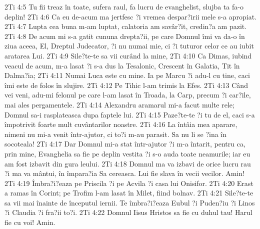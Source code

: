2Ti 4:5  Tu fii treaz în toate, sufera raul, fa lucru de evanghelist, slujba ta fa-o deplin!
2Ti 4:6  Ca eu de-acum ma jertfesc ?i vremea despar?irii mele s-a apropiat.
2Ti 4:7  Lupta cea buna m-am luptat, calatoria am savâr?it, credin?a am pazit.
2Ti 4:8  De acum mi s-a gatit cununa drepta?ii, pe care Domnul îmi va da-o în ziua aceea, El, Dreptul Judecator, ?i nu numai mie, ci ?i tuturor celor ce au iubit aratarea Lui.
2Ti 4:9  Sile?te-te sa vii curând la mine,
2Ti 4:10  Ca Dimas, iubind veacul de acum, m-a lasat ?i s-a dus la Tesalonic, Crescent în Galatia, Tit în Dalma?ia;
2Ti 4:11  Numai Luca este cu mine. Ia pe Marcu ?i adu-l cu tine, caci îmi este de folos în slujire.
2Ti 4:12  Pe Tihic l-am trimis la Efes.
2Ti 4:13  Când vei veni, adu-mi felonul pe care l-am lasat în Troada, la Carp, precum ?i car?ile, mai ales pergamentele.
2Ti 4:14  Alexandru aramarul mi-a facut multe rele; Domnul sa-i rasplateasca dupa faptele lui.
2Ti 4:15  Paze?te-te ?i tu de el, caci s-a împotrivit foarte mult cuvântarilor noastre.
2Ti 4:16  La întâia mea aparare, nimeni nu mi-a venit într-ajutor, ci to?i m-au parasit. Sa nu li se ?ina în socoteala!
2Ti 4:17  Dar Domnul mi-a stat într-ajutor ?i m-a întarit, pentru ca, prin mine, Evanghelia sa fie pe deplin vestita ?i s-o auda toate neamurile; iar eu am fost izbavit din gura leului.
2Ti 4:18  Domnul ma va izbavi de orice lucru rau ?i ma va mântui, în împara?ia Sa cereasca. Lui fie slava în vecii vecilor. Amin!
2Ti 4:19  Îmbra?i?eaza pe Priscila ?i pe Acvila ?i casa lui Onisifor.
2Ti 4:20  Erast a ramas în Corint; pe Trofim l-am lasat în Milet, fiind bolnav.
2Ti 4:21  Sile?te-te sa vii mai înainte de începutul iernii. Te îmbra?i?eaza Eubul ?i Puden?iu ?i Linos ?i Claudia ?i fra?ii to?i.
2Ti 4:22  Domnul Iisus Hristos sa fie cu duhul tau! Harul fie cu voi! Amin.


